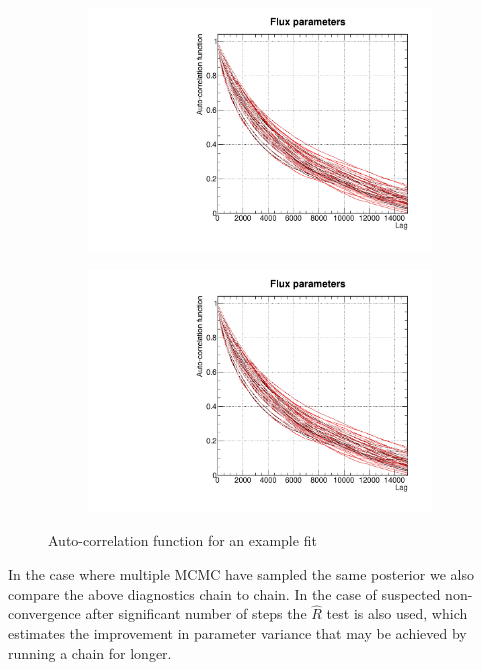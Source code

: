 \begin{figure}[h]
	\begin{subfigure}[t]{0.40\textwidth}
		\includegraphics[width=\textwidth, trim={0mm 0mm 0mm 0mm}, clip,page=1]{figures/mcmc/2018a_MultiPi_Binningv6_NewCov_Data_merge_MCMC_diag}
	\end{subfigure}
	\begin{subfigure}[t]{0.40\textwidth}
		\includegraphics[width=\textwidth, trim={0mm 0mm 0mm 0mm}, clip,page=2]{figures/mcmc/2018a_MultiPi_Binningv6_NewCov_Data_merge_MCMC_diag}
	\end{subfigure}
	\caption{Auto-correlation function for an example fit}
	\label{fig:auto_corr}
\end{figure}

In the case where multiple MCMC have sampled the same posterior we also compare the above diagnostics chain to chain. In the case of suspected non-convergence after significant number of steps the $\hat{R}$ test\cite{gelman_rubin} is also used, which estimates the improvement in parameter variance that may be achieved by running a chain for longer.

